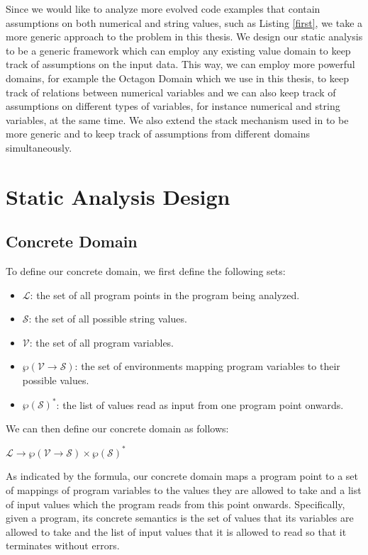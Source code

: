\documentclass[10pt]{report}
\begin{document}
Since we would like to analyze more evolved code examples that contain assumptions on both numerical and string values, such as Listing \ref{first}, we take a more generic approach to the problem in this thesis. We design our static analysis to be a generic framework which can employ any existing value domain to keep track of assumptions on the input data. This way, we can employ more powerful domains, for example the Octagon Domain which we use in this thesis, to keep track of relations between numerical variables and we can also keep track of assumptions on different types of variables, for instance numerical and string variables, at the same time. We also extend the stack mechanism used in \cite{madelin} to be more generic and to keep track of assumptions from different domains simultaneously.  

\chapter{Static Analysis Design} \label{analysis}

\section{Concrete Domain} \label{concrete}

To define our concrete domain, we first define the following sets:
\begin{itemize}
	\item $\mathcal{L}$: the set of all program points in the program being analyzed. 
	\item $\mathcal{S}$: the set of all possible string values. 
	\item $\mathcal{V}$: the set of all program variables.
	\item$\wp(\mathcal{V} \rightarrow \mathcal{S})$: the set of environments mapping program variables to their possible values. 
	\item $\wp(\mathcal{S})^{*}$: the list of values read as input from one program point onwards.  
\end{itemize}

We can then define our concrete domain as follows: 
\begin{center}
$\mathcal{L} \rightarrow \wp(\mathcal{V} \rightarrow \mathcal{S}) \times \wp(\mathcal{S})^{*}$
\end{center}

As indicated by the formula, our  concrete domain maps a program point to a set of mappings of program variables to the values they are allowed to take and a list of input values which the program reads from this point onwards. Specifically, given a program, its concrete semantics is the set of values that its variables are allowed to take and the list of input values that it is allowed to read so that it terminates without errors.   
\end{document}
